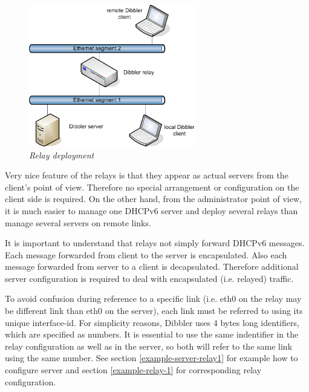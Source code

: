 \begin{figure}[ht]
\begin{center}
\includegraphics[width=0.65\textwidth]{dibbler-relay}
\caption{\emph{Relay deployment}}
\end{center}
\end{figure}

Very nice feature of the relays is that they appear as actual servers
from the client's point of view. Therefore no special arrangement or
configuration on the client side is required. On the other hand, from
the administrator point of view, it is much easier to manage one DHCPv6
server and deploy several relays than manage several servers on remote
links. 

It is important to understand that relays not simply forward DHCPv6
messages. Each message forwarded from client to the server is
encapsulated. Also each message forwarded from server to a client is
decapsulated. Therefore additional server configuration is required to
deal with encapsulated (i.e. relayed) traffic.

To avoid confusion during reference to a specific link (i.e. eth0 on
the relay may be different link than eth0 on the server), each link
must be referred to using its unique interface-id. For simplicity
reasons, Dibbler uses 4 bytes long identifiers, which are specified as
numbers. It is essential to use the same indentifier in the relay
configuration as well as in the server, so both will refer to the same
link using the same number. See section \ref{example-server-relay1} for
example how to configure server and section \ref{example-relay-1} for 
corresponding relay configuration.

